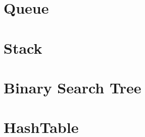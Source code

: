 \documentclass[../main.tex]{subfiles}
\begin{document}
	
	
	\section{Queue}
	
	
	
	
	\section{Stack}
	
	
	
	
	\section{Binary Search Tree}
	
	\section{HashTable}
	
\end{document}
